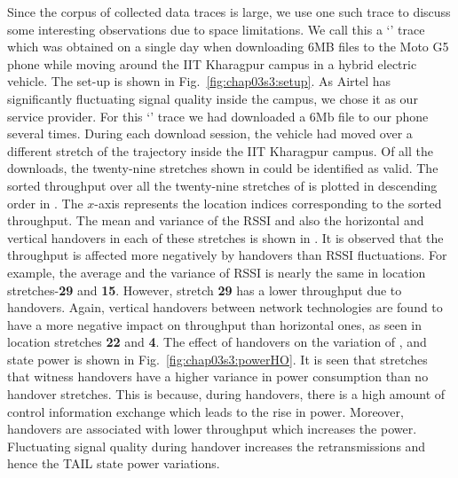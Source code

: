 \indent  Since the corpus of collected data traces is large, we use one such trace to discuss some interesting observations due to space limitations. We call this a `' trace which was obtained on a single day when downloading 6MB files to the Moto G5 phone while moving around the IIT Kharagpur campus in a hybrid electric vehicle. The set-up is shown in Fig.~\ref{fig:chap03s3:setup}. As Airtel has significantly fluctuating signal quality inside the campus, we chose it as our service provider.  For this `' trace we had downloaded a 6Mb file to our phone several times. During each download session, the vehicle had moved over a different stretch of the trajectory inside the IIT Kharagpur campus.  Of all the downloads, the twenty-nine stretches  shown in \fig{\ref{fig:chap03s3:technology_with_traj}} could be identified as valid. The sorted throughput over all the twenty-nine stretches of  \fig{\ref{fig:chap03s3:technology_with_traj}} is plotted in descending order in \fig{\ref{fig:chap03s3:thptHO}}. The $x$-axis represents the location indices corresponding to the sorted throughput. The mean and variance of the \ac{RSSI} and also the horizontal and vertical handovers in each of these stretches is shown in \fig{\ref{fig:chap03s3:thptHO}}.  It is observed that the throughput is affected more negatively by handovers than \ac{RSSI} fluctuations. For example, the average and the variance of \ac{RSSI} is nearly the same  in location stretches-\textbf{29} and \textbf{15}. However, stretch \textbf{29} has a lower throughput due to handovers. Again, vertical handovers between network technologies  are found to have a more negative impact on throughput than horizontal ones, as seen in location stretches {\bf 22}  and {\bf 4}.  The effect of handovers on the variation of ,  and  state power is shown in Fig.~\ref{fig:chap03s3:powerHO}. It is seen that stretches that witness handovers have a higher variance in  power consumption than no handover stretches. This is because, during handovers, there is a high amount of control information exchange which leads to the rise in  power. Moreover, handovers are associated with lower throughput which increases the  power. Fluctuating signal quality during handover increases the retransmissions and hence the TAIL state power variations.


